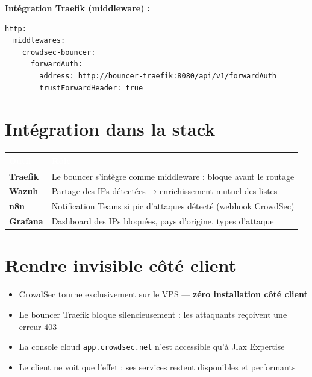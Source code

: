 \documentclass[11pt, a4paper]{article}
\begin{document}
\textbf{Intégration Traefik (middleware) :}
\begin{lstlisting}[style=yamlstyle, caption={traefik/dynamic/crowdsec.yml}]
http:
  middlewares:
    crowdsec-bouncer:
      forwardAuth:
        address: http://bouncer-traefik:8080/api/v1/forwardAuth
        trustForwardHeader: true
\end{lstlisting}

\section{Intégration dans la stack}

\begin{center}
\renewcommand{\arraystretch}{1.4}
\begin{tabularx}{\linewidth}{>{\bfseries}p{2.8cm} X}
\toprule
\rowcolor{tabheader}
\textcolor{white}{\textbf{Outil}} & \textcolor{white}{\textbf{Rôle}} \\
\midrule
Traefik & Le bouncer s'intègre comme middleware : bloque avant le routage \\
\rowcolor{rowgray}
Wazuh & Partage des IPs détectées → enrichissement mutuel des listes \\
n8n & Notification Teams si pic d'attaques détecté (webhook CrowdSec) \\
\rowcolor{rowgray}
Grafana & Dashboard des IPs bloquées, pays d'origine, types d'attaque \\
\bottomrule
\end{tabularx}
\end{center}

\section{Rendre invisible côté client}

\begin{itemize}
  \item CrowdSec tourne exclusivement sur le VPS — \textbf{zéro installation côté client}
  \item Le bouncer Traefik bloque silencieusement : les attaquants reçoivent une erreur 403
  \item La console cloud \texttt{app.crowdsec.net} n'est accessible qu'à Jlax Expertise
  \item Le client ne voit que l'effet : ses services restent disponibles et performants
\end{itemize}
\end{document}

